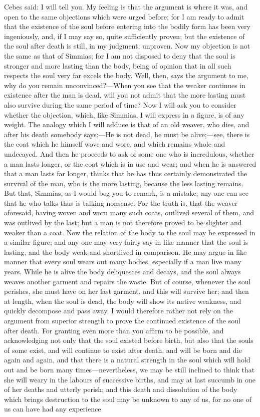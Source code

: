 \documentclass[11pt,letter]{article}
\begin{document}
\par  Cebes said: I will tell you. My feeling is that the argument is where it was, and open to the same objections which were urged before; for I am ready to admit that the existence of the soul before entering into the bodily form has been very ingeniously, and, if I may say so, quite sufficiently proven; but the existence of the soul after death is still, in my judgment, unproven. Now my objection is not the same as that of Simmias; for I am not disposed to deny that the soul is stronger and more lasting than the body, being of opinion that in all such respects the soul very far excels the body. Well, then, says the argument to me, why do you remain unconvinced?—When you see that the weaker continues in existence after the man is dead, will you not admit that the more lasting must also survive during the same period of time? Now I will ask you to consider whether the objection, which, like Simmias, I will express in a figure, is of any weight. The analogy which I will adduce is that of an old weaver, who dies, and after his death somebody says:—He is not dead, he must be alive;—see, there is the coat which he himself wove and wore, and which remains whole and undecayed. And then he proceeds to ask of some one who is incredulous, whether a man lasts longer, or the coat which is in use and wear; and when he is answered that a man lasts far longer, thinks that he has thus certainly demonstrated the survival of the man, who is the more lasting, because the less lasting remains. But that, Simmias, as I would beg you to remark, is a mistake; any one can see that he who talks thus is talking nonsense. For the truth is, that the weaver aforesaid, having woven and worn many such coats, outlived several of them, and was outlived by the last; but a man is not therefore proved to be slighter and weaker than a coat. Now the relation of the body to the soul may be expressed in a similar figure; and any one may very fairly say in like manner that the soul is lasting, and the body weak and shortlived in comparison. He may argue in like manner that every soul wears out many bodies, especially if a man live many years. While he is alive the body deliquesces and decays, and the soul always weaves another garment and repairs the waste. But of course, whenever the soul perishes, she must have on her last garment, and this will survive her; and then at length, when the soul is dead, the body will show its native weakness, and quickly decompose and pass away. I would therefore rather not rely on the argument from superior strength to prove the continued existence of the soul after death. For granting even more than you affirm to be possible, and acknowledging not only that the soul existed before birth, but also that the souls of some exist, and will continue to exist after death, and will be born and die again and again, and that there is a natural strength in the soul which will hold out and be born many times—nevertheless, we may be still inclined to think that she will weary in the labours of successive births, and may at last succumb in one of her deaths and utterly perish; and this death and dissolution of the body which brings destruction to the soul may be unknown to any of us, for no one of us can have had any experience 
\end{document}
